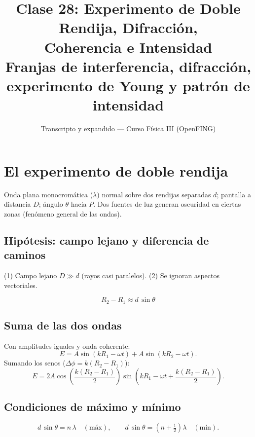 \documentclass[12pt,a4paper]{article}
\title{\textbf{Clase 28: Experimento de Doble Rendija, Difracción, \\
        Coherencia e Intensidad}\\[0.3em]
        \large{Franjas de interferencia, difracción, experimento de Young
              y patrón de intensidad}}
\author{Transcripto y expandido --- Curso Física III (OpenFING)}
\date{}
\begin{document}
\maketitle
\thispagestyle{empty}
\newpage

\tableofcontents
\newpage

\section{El experimento de doble rendija}

Onda plana monocromática ($\lambda$) normal sobre dos rendijas separadas $d$;
pantalla a distancia $D$; ángulo $\theta$ hacia $P$. Dos fuentes de luz generan
oscuridad en ciertas zonas (fenómeno general de las ondas).

\subsection{Hipótesis: campo lejano y diferencia de caminos}

(1) Campo lejano $D \gg d$ (rayos casi paralelos). (2) Se ignoran aspectos
vectoriales.

\begin{keybox}
  \[
  \boxed{R_2 - R_1 \approx d\,\sin\theta}
  \]
\end{keybox}



\subsection{Suma de las dos ondas}

Con amplitudes iguales y onda coherente:
\[
E = A\sin(kR_1 - \omega t) + A\sin(kR_2 - \omega t).
\]
Sumando los senos ($\Delta\phi = k(R_2-R_1)$):
\[
E = 2A\cos\!\left(\frac{k(R_2-R_1)}{2}\right)
    \sin\!\left(kR_1 - \omega t + \frac{k(R_2-R_1)}{2}\right).
\]



\subsection{Condiciones de máximo y mínimo}

\begin{keybox}
  \[
  \boxed{d\,\sin\theta = n\,\lambda} \quad (\text{máx}), \qquad
  \boxed{d\,\sin\theta = \left(n+\tfrac12\right)\lambda} \quad (\text{mín}).
  \]
\end{keybox}
\end{document}
